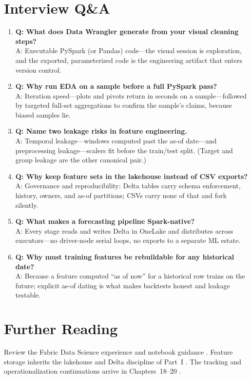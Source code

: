 \section{Interview Q\&A}
\begin{enumerate}
    \item \textbf{Q: What does Data Wrangler generate from your visual cleaning steps?}\\
    A: Executable PySpark (or Pandas) code---the visual session is exploration, and the exported, parameterized code is the engineering artifact that enters version control.
    \item \textbf{Q: Why run EDA on a sample before a full PySpark pass?}\\
    A: Iteration speed---plots and pivots return in seconds on a sample---followed by targeted full-set aggregations to confirm the sample's claims, because biased samples lie.
    \item \textbf{Q: Name two leakage risks in feature engineering.}\\
    A: Temporal leakage---windows computed past the as-of date---and preprocessing leakage---scalers fit before the train/test split. (Target and group leakage are the other canonical pair.)
    \item \textbf{Q: Why keep feature sets in the lakehouse instead of CSV exports?}\\
    A: Governance and reproducibility: Delta tables carry schema enforcement, history, owners, and as-of partitions; CSVs carry none of that and fork silently.
    \item \textbf{Q: What makes a forecasting pipeline Spark-native?}\\
    A: Every stage reads and writes Delta in OneLake and distributes across executors---no driver-node serial loops, no exports to a separate ML estate.
    \item \textbf{Q: Why must training features be rebuildable for any historical date?}\\
    A: Because a feature computed ``as of now'' for a historical row trains on the future; explicit as-of dating is what makes backtests honest and leakage testable.
\end{enumerate}

\section{Further Reading}
Review the Fabric Data Science experience \cite{microsoftFabricDataScience} and notebook guidance \cite{microsoftFabricNotebooks}. Feature storage inherits the lakehouse and Delta discipline of Part~I \cite{microsoftFabricLakehouse,deltaLakeDocs}. The tracking and operationalization continuations arrive in Chapters~18--20 \cite{microsoftMlflowFabric,mlflowDocs,microsoftFabricMlTraining}.


